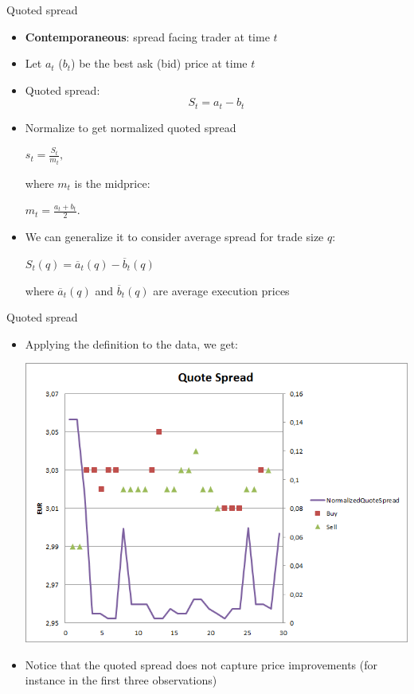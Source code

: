 \documentclass[english,10pt
,aspectratio=169
]{beamer}
\begin{document}
\begin{frame}{Quoted spread}
	\begin{itemize}
		\item \textbf{Contemporaneous}: spread facing trader at time $t$
		\item Let $a_t$ ($b_t$) be the best ask (bid) price at time $t$
		\item \alert{Quoted spread}:
		\begin{equation*}
			S_t = a_t -b_t
		\end{equation*}
		\item \pause Normalize to get \alert{normalized quoted spread}
		\begin{center}
			$
			s_t = \frac{S_t}{m_t},
			$
		\end{center}
		where $m_t$ is the midprice:
		\begin{center}
			$
			m_t = \frac{a_t+b_t}{2}.
			$
		\end{center}
		\pause
		\item We can generalize it to consider average spread for trade size $q$: 
		\begin{center}$S_t(q)=\overline{a}_t(q)-\overline{b}_t(q)$\end{center}
		where $\overline{a}_t(q)$ and $\overline{b}_t(q)$ are average execution prices
	\end{itemize}
\end{frame}


\begin{frame}{Quoted spread}
	\begin{itemize}
		\item Applying the definition to the data, we get:
		\begin{center}	
			\includegraphics[scale=0.35]{pics/L2_quotespread}
		\end{center}
		\item Notice that the quoted spread does not capture price improvements (for instance in the first three observations)
	\end{itemize}
\end{frame}
\end{document}
